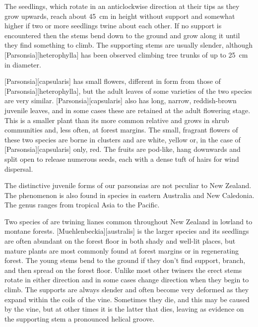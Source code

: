 The seedlings, which rotate in an anticlockwise direction at their tips as they grow upwards, reach about \SI{45}{\centi\metre} in height without support and somewhat higher if two or more seedlings twine about each other.
If no support is encountered then the stems bend down to the ground and grow along it until they find something to climb.
The supporting stems are usually slender, although [Parsonsia][heterophylla] has been observed climbing tree trunks of up to \SI{25}{\centi\metre} in diameter.

[Parsonsia][capsularis] has small flowers, different in form from those of [Parsonsia][heterophylla], but the adult leaves of some varieties of the two species are very similar. [Parsonsia][capsularis] also has long, narrow, reddish-brown juvenile leaves, and in some cases these are retained at the adult flowering stage.
This is a smaller plant than its more common relative and grows in shrub communities and, less often, at forest margins.
The small, fragrant flowers of these two species are borne in clusters and are white, yellow or, in the case of [Parsonsia][capsularis] only, red.
The fruits are pod-like, hang downwards and split open to release numerous seeds, each with a dense tuft of hairs for wind dispersal.

The distinctive juvenile forms of our parsonsias are not peculiar to New Zealand.
The phenomenon is also found in species in eastern Australia and New Caledonia.
The genus ranges from tropical Asia to the Pacific.

Two species of  are twining lianes common throughout New Zealand in lowland to montane forests. [Muehlenbeckia][australis] is the larger species and its seedlings are often abundant on the forest floor in both shady and well-lit places, but mature plants are most commonly found at forest margins or in regenerating forest.
The young stems bend to the ground if they don't find support, branch, and then spread on the forest floor.
Unlike most other twiners the erect stems rotate in either direction and in some cases change direction when they begin to climb.
The supports are always slender and often become very deformed as they expand within the coils of the vine.
Sometimes they die, and this may be caused by the vine, but at other times it is the latter that dies, leaving as evidence on the supporting stem a pronounced helical groove.

